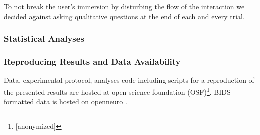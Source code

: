 To not break the user's immersion by disturbing the flow of the interaction we decided against asking qualitative questions at the end of each and every trial.

\subsubsection{Statistical Analyses}







\subsubsection{Reproducing Results and Data Availability}
Data, experimental protocol, analyses code including scripts for a reproduction of the presented results are hosted at open science foundation (OSF)\footnote{[anonymized]}. BIDS formatted data is hosted on openneuro \cite{}.